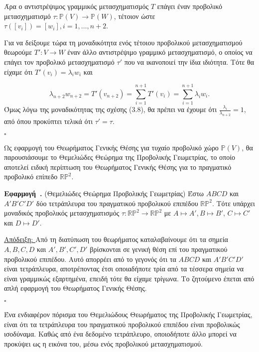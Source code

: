 \documentclass[12pt, a4paper]{book}
\newcounter{app}[section]
\newenvironment{app}[1][]{\refstepcounter{app}\par\medskip
   \textbf{Εφαρμογή~\theapp. #1} \rmfamily}{\medskip}
\begin{document}
Άρα ο αντιστρέψιμος γραμμικός μετασχηματισμός $T$ επάγει έναν προβολικό μετασχηματισμό $τ: \mathbb{P}(V) \rightarrow \mathbb{P}(W)$, τέτοιον ώστε $τ([v_i]) = [w_i], i = 1,…,n+2$.

Για να δείξουμε τώρα τη μοναδικότητα ενός τέτοιου προβολικού μετασχηματισμού θεωρούμε $T' : V \rightarrow W$ έναν άλλο αντιστρέψιμο γραμμικό μετασχηματισμό, ο οποίος να επάγει τον προβολικό μετασχηματισμό $τ'$ που να ικανοποιεί την ίδια ιδιότητα. Τότε θα είχαμε ότι $T'(v_i) = λ_iw_i$ και

\begin{displaymath}
λ_{n+2}w_{n+2} = T'(v_{n+2}) = \sum_{i=1}^{n+1} T'(v_i)= \sum_{i=1}^{n+1} λ_iw_i.
\end{displaymath}
Όμως λόγω της μοναδικότητας της σχέσης (3.8), θα πρέπει να έχουμε ότι $\frac{λ_i}{λ_{n+2}} = 1$, από όπου προκύπτει τελικά ότι $τ' = τ$.
  \begin{flushright}
  $\square$
  \end{flushright}
  
Ως εφαρμογή του Θεωρήματος Γενικής Θέσης για τυχαίο προβολικό χώρο $\mathbb{P}(V)$, θα παρουσιάσουμε το Θεμελιώδες Θεώρημα της Προβολικής Γεωμετρίας, το οποίο αποτελεί ειδική περίπτωση του Θεωρήματος Γενικής Θέσης για το πραγματικό προβολικό επίπεδο $\mathbb{R}\mathbb{P}^2$.

\begin{app} (Θεμελιώδες Θεώρημα Προβολικής Γεωμετρίας) 
Έστω $ABCD$ και $A'B'C'D'$ δύο τετράπλευρα του πραγματικού προβολικού επιπέδου $\mathbb{R}\mathbb{P}^2$. Τότε υπάρχει μοναδικός προβολικός μετασχηματισμός $τ: \mathbb{R}\mathbb{P}^2 \rightarrow \mathbb{R}\mathbb{P}^2$ με $A \mapsto A', B \mapsto B',\, C \mapsto C'$ και $D \mapsto D'$.
\end{app}

\underline{Απόδειξη: } Από τη διατύπωση του θεωρήματος καταλαβαίνουμε ότι τα σημεία $A, B, C, D$ και  $A', B', C', D'$ βρίσκονται σε γενική θέση επί του πραγματικού προβολικού επιπέδου. Αυτό απορρέει από το γεγονός ότι τα $ABCD$ και $A'B'C'D'$ είναι τετράπλευρα, αποτρέποντας έτσι οποιαδήποτε τρία από τα τέσσερα σημεία να είναι γραμμικώς εξαρτημένα, επειδή τότε θα είχαμε τρίγωνα. Το ζητούμενο έπεται από απλή εφαρμογή του Θεωρήματος Γενικής Θέσης.
  \begin{flushright}
  $\square$
  \end{flushright}
  
Ένα ενδιαφέρον πόρισμα του Θεμελιώδους Θεωρήματος της Προβολικής Γεωμετρίας, είναι ότι τα τετράπλευρα του πραγματικού προβολικού επιπέδου είναι προβολικώς ισοδύναμα. Καθώς από ένα δεδομένο τετράπλευρο, οποιοδήποτε άλλο μπορεί να προκύψει ως η εικόνα του, μέσω ενός προβολικού μετασχηματισμού.
\end{document}
